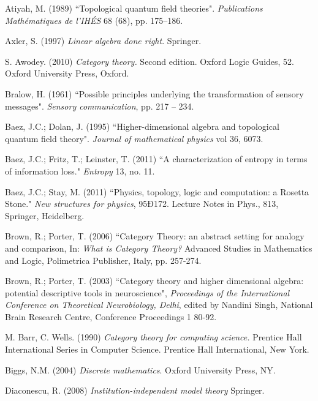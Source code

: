 \documentclass{book}
\def\rr{\raggedright}
\theoremstyle{remark}
\theoremstyle{definition}
\begin{document}

\begin{thebibliography}{SGWB}\rr

 Atiyah, M. (1989) ``Topological quantum field theories". {\em Publications Math\'{e}matiques de l'IH\'{E}S} 68 (68), pp. 175--186.

 Axler, S. (1997) {\em Linear algebra done right}. Springer. 

 S. Awodey. (2010) {\em Category theory.} Second edition. Oxford Logic Guides, 52. Oxford University Press, Oxford.

 Bralow, H. (1961) ``Possible principles underlying the transformation of sensory messages". {\em Sensory communication}, pp. 217 -- 234.

 Baez, J.C.; Dolan, J. (1995) ``Higher-dimensional algebra and topological quantum field theory". {\em Journal of mathematical physics} vol 36, 6073.

 Baez, J.C.; Fritz, T.; Leinster, T. (2011) ``A characterization of entropy in terms of information loss." {\em Entropy} 13, no. 11.

 Baez, J.C.; Stay, M. (2011) ``Physics, topology, logic and computation: a Rosetta Stone." {\em New structures for physics}, 95Ð172. Lecture Notes in Phys., 813, Springer, Heidelberg.

 Brown, R.; Porter, T. (2006) ``Category Theory: an abstract setting for
analogy and comparison, In: {\em What is Category Theory?} Advanced
Studies in Mathematics and Logic, Polimetrica Publisher, Italy, pp. 257-274.

 Brown, R.; Porter, T. (2003) ``Category theory and higher dimensional
algebra: potential descriptive tools in neuroscience", {\em Proceedings
of the International Conference on Theoretical Neurobiology, Delhi}, edited by Nandini Singh, National Brain Research
Centre, Conference Proceedings 1 80-92. 

 M. Barr, C. Wells. (1990) {\em Category theory for computing science.} Prentice Hall International Series in Computer Science. Prentice Hall International, New York.

 Biggs, N.M. (2004) {\em Discrete mathematics}. Oxford University Press, NY. 

 Diaconescu, R. (2008) {\em Institution-independent model theory} Springer.


\end{thebibliography}
\end{document}
